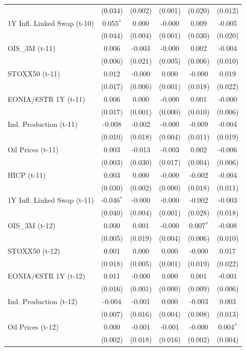 \begin{longtable}[t]{lccccc}
 & (0.034) & (0.002) & (0.001) & (0.020) & (0.012)\\
1Y Infl. Linked Swap (t-10) & 0.055$^{*}$ & 0.000 & -0.000 & 0.009 & -0.005\\
 & (0.044) & (0.004) & (0.001) & (0.030) & (0.020)\\
OIS\_3M (t-11) & 0.006 & -0.003 & -0.000 & 0.002 & -0.004\\
 & (0.006) & (0.021) & (0.005) & (0.006) & (0.010)\\
STOXX50 (t-11) & 0.012 & -0.000 & 0.000 & -0.000 & 0.019\\
 & (0.017) & (0.006) & (0.001) & (0.018) & (0.022)\\
EONIA/€STR 1Y (t-11) & 0.006 & 0.000 & -0.000 & 0.001 & -0.000\\
 & (0.017) & (0.001) & (0.000) & (0.010) & (0.006)\\
Ind. Production (t-11) & -0.008 & -0.002 & -0.000 & -0.009 & -0.004\\
 & (0.010) & (0.018) & (0.004) & (0.011) & (0.019)\\
Oil Prices (t-11) & 0.003 & -0.013 & -0.003 & 0.002 & -0.006\\
 & (0.003) & (0.030) & (0.017) & (0.004) & (0.006)\\
HICP (t-11) & 0.003 & 0.000 & -0.000 & -0.002 & -0.004\\
 & (0.030) & (0.002) & (0.000) & (0.018) & (0.011)\\
1Y Infl. Linked Swap (t-11) & -0.046$^{*}$ & -0.000 & -0.000 & -0.002 & -0.003\\
 & (0.040) & (0.004) & (0.001) & (0.028) & (0.018)\\
OIS\_3M (t-12) & 0.000 & 0.001 & -0.000 & 0.007$^{*}$ & -0.008\\
 & (0.005) & (0.019) & (0.004) & (0.006) & (0.010)\\
STOXX50 (t-12) & 0.001 & 0.000 & 0.000 & -0.000 & 0.017\\
 & (0.018) & (0.005) & (0.001) & (0.019) & (0.022)\\
EONIA/€STR 1Y (t-12) & 0.011 & -0.000 & 0.000 & 0.001 & -0.001\\
 & (0.016) & (0.001) & (0.000) & (0.009) & (0.006)\\
Ind. Production (t-12) & -0.004 & -0.001 & 0.000 & -0.003 & 0.003\\
 & (0.007) & (0.016) & (0.004) & (0.008) & (0.013)\\
Oil Prices (t-12) & 0.000 & -0.001 & -0.001 & -0.000 & 0.004$^{*}$\\
 & (0.002) & (0.018) & (0.016) & (0.002) & (0.004)\\

\end{longtable}
